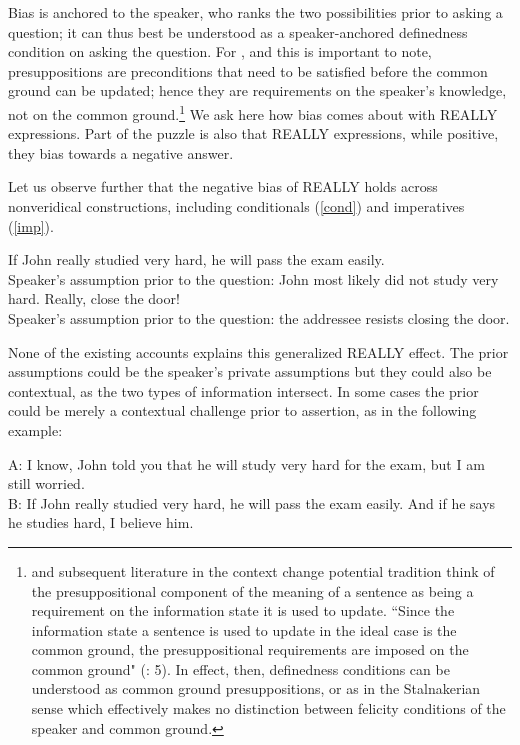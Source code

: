 \documentclass[output=paper,colorlinks,citecolor=brown]{langscibook}
\begin{document}
Bias is anchored to the speaker, who ranks the two possibilities prior to asking a question; it can thus best be understood as a speaker-anchored definedness condition on asking the question. For \citet{stalnaker1978}, and this is important to note, presuppositions are preconditions that need to be satisfied before the common ground can be updated; hence they are requirements on the speaker's knowledge, not on the common ground.\footnote{\citet{von2008} and subsequent literature in the context change potential tradition think of the presuppositional component of the meaning of a sentence as being a requirement on the information state it is used to update. ``Since the information state a sentence is used to update in the ideal case is the common ground, the presuppositional requirements are imposed on the common ground" (\citealt{von2008}: 5). In effect, then, definedness conditions can be understood as common ground presuppositions, or as in the Stalnakerian sense which effectively makes no distinction between felicity conditions of the speaker and common ground.} We ask here how bias comes about with \textsc{REALLY} expressions.  Part of the puzzle is also that \textsc{REALLY} expressions, while positive, they bias towards a negative answer.    
   


Let us observe further that  the negative bias of \textsc{REALLY} holds across nonveridical constructions, including conditionals (\ref{cond}) and imperatives (\ref{imp}). 

\ea \ea If John really studied very hard, he will pass the exam easily. \label{cond} \\ 
Speaker's assumption prior to the question:  John most likely did not study very hard. 
\ex Really, close the door! \label{imp} \\ 
Speaker's assumption prior to the question: the addressee resists closing the door. 
\z
\z

 None of the existing accounts explains this generalized \textsc{REALLY} effect. The prior assumptions could be the speaker's private assumptions but they could also be contextual, as the two types of information intersect. In some cases the prior could be merely a contextual challenge prior to assertion, as in the following example:

\ea A: I know, John told you that he will study very hard for the exam, but I am still worried. \\
B: If John really studied very hard, he will pass the exam easily. And if he says he studies
hard, I believe him. 
\z
\end{document}
